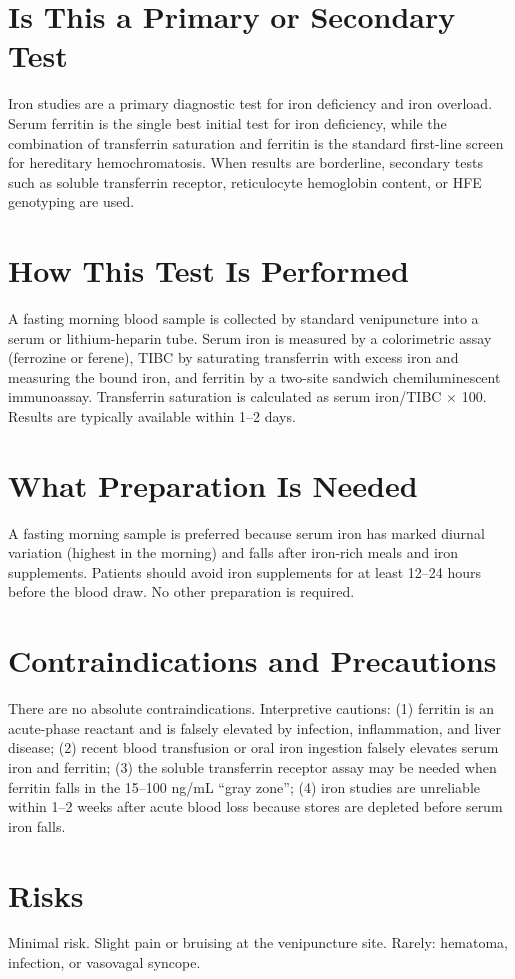 \section*{Is This a Primary or Secondary Test}
Iron studies are a primary diagnostic test for iron deficiency and iron overload. Serum ferritin is the single best initial test for iron deficiency, while the combination of transferrin saturation and ferritin is the standard first-line screen for hereditary hemochromatosis. When results are borderline, secondary tests such as soluble transferrin receptor, reticulocyte hemoglobin content, or HFE genotyping are used.
\section*{How This Test Is Performed}
A fasting morning blood sample is collected by standard venipuncture into a serum or lithium-heparin tube. Serum iron is measured by a colorimetric assay (ferrozine or ferene), TIBC by saturating transferrin with excess iron and measuring the bound iron, and ferritin by a two-site sandwich chemiluminescent immunoassay. Transferrin saturation is calculated as serum iron/TIBC $\times$ 100. Results are typically available within 1--2 days.
\section*{What Preparation Is Needed}
A fasting morning sample is preferred because serum iron has marked diurnal variation (highest in the morning) and falls after iron-rich meals and iron supplements. Patients should avoid iron supplements for at least 12--24 hours before the blood draw. No other preparation is required.
\section*{Contraindications and Precautions}
There are no absolute contraindications. Interpretive cautions: (1) ferritin is an acute-phase reactant and is falsely elevated by infection, inflammation, and liver disease; (2) recent blood transfusion or oral iron ingestion falsely elevates serum iron and ferritin; (3) the soluble transferrin receptor assay may be needed when ferritin falls in the 15--100 ng/mL ``gray zone''; (4) iron studies are unreliable within 1--2 weeks after acute blood loss because stores are depleted before serum iron falls.
\section*{Risks}
Minimal risk. Slight pain or bruising at the venipuncture site. Rarely: hematoma, infection, or vasovagal syncope.
